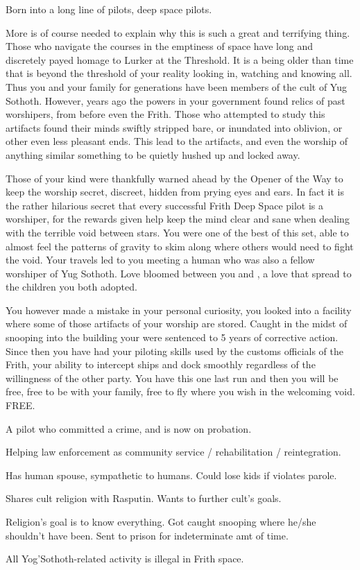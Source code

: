 \documentclass[char]{guildcamp4}
\begin{document}
\name{\cPilot{}}

Born into a long line of pilots, deep space pilots. 

More is of course needed to explain why this is such a great and terrifying thing.
Those who navigate the courses in the emptiness of space have long and discretely payed homage to Lurker at the Threshold. It is a being older than time that is beyond the threshold of your reality looking in, watching and knowing all. Thus you and your family for generations have been members of the cult of Yug Sothoth. However, years ago the powers in your government found relics of past worshipers, from before even the Frith. Those who attempted to study this artifacts found their minds swiftly stripped bare, or inundated into oblivion, or other even less pleasant ends. This lead to the artifacts, and even the worship of anything similar something to be quietly hushed up and locked away. 

Those of your kind were thankfully warned ahead by the Opener of the Way to keep the worship secret, discreet, hidden from prying eyes and ears. 
In fact it is the rather hilarious secret that every successful Frith Deep Space pilot is a worshiper, for the rewards given help keep the mind clear and sane when dealing with the terrible void between stars. You were one of the best of this set, able to almost feel the patterns of gravity to skim along where others would need to fight the void. Your travels led to you meeting a human who was also a fellow worshiper of Yug Sothoth.  Love bloomed between you and \cAlice{}, a love that spread to the children you both adopted. 

You however made a mistake in your personal curiosity, you looked into a facility where some of those artifacts of your worship are stored. Caught in the midst of snooping into the building your were sentenced to 5 years of corrective action. Since then you have had your piloting skills used by the customs officials of the Frith, your ability to intercept ships and dock smoothly regardless of the willingness of the other party. 
You have this one last run and then you will be free, free to be with your family, free to fly where you wish in the welcoming void. FREE. 


\begin{itemz}[Backstory]
    \item A pilot who committed a crime, and is now on probation.
    \item Helping law enforcement as community service / rehabilitation / reintegration.
    \item Has human spouse, sympathetic to humans. Could lose kids if violates parole.
    \item Shares cult religion with Rasputin. Wants to further cult's goals.
    \item Religion's goal is to know everything. Got caught snooping where he/she shouldn't have been. Sent to prison for indeterminate amt of time.
    \item All Yog'Sothoth-related activity is illegal in Frith space.
\end{itemz}
\end{document}
